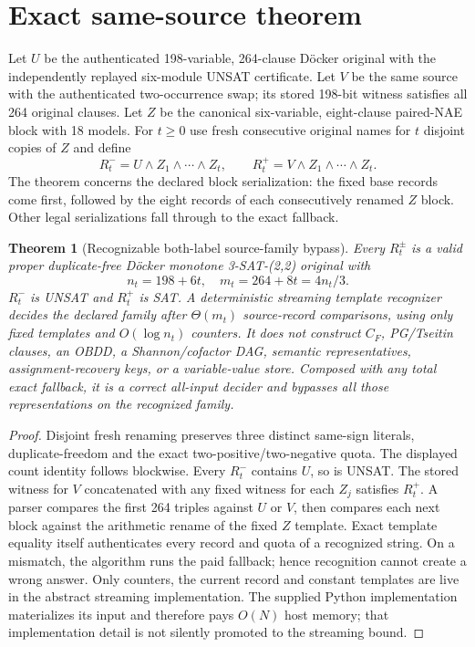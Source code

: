 \documentclass[11pt]{article}
\newtheorem{theorem}{Theorem}
\begin{document}
\section{Exact same-source theorem}
Let $U$ be the authenticated 198-variable, 264-clause D\"ocker original with
the independently replayed six-module UNSAT certificate.  Let $V$ be the
same source with the authenticated two-occurrence swap; its stored 198-bit
witness satisfies all 264 original clauses.  Let $Z$ be the canonical
six-variable, eight-clause paired-NAE block with 18 models.  For $t\ge0$ use
fresh consecutive original names for $t$ disjoint copies of $Z$ and define
\[
 R_t^- = U\wedge Z_1\wedge\cdots\wedge Z_t,
 \qquad R_t^+ = V\wedge Z_1\wedge\cdots\wedge Z_t .
\]
The theorem concerns the declared block serialization: the fixed base records
come first, followed by the eight records of each consecutively renamed $Z$
block.  Other legal serializations fall through to the exact fallback.

\begin{theorem}[Recognizable both-label source-family bypass]
Every $R_t^\pm$ is a valid proper duplicate-free D\"ocker monotone
3-SAT-(2,2) original with
\[
 n_t=198+6t,\quad m_t=264+8t=4n_t/3.
\]
$R_t^-$ is UNSAT and $R_t^+$ is SAT.  A deterministic streaming template
recognizer decides the declared family after $\Theta(m_t)$ source-record
comparisons, using only fixed templates and $O(\log n_t)$ counters.  It does
not construct $C_F$, PG/Tseitin clauses, an OBDD, a Shannon/cofactor DAG,
semantic representatives, assignment-recovery keys, or a variable-value
store.  Composed with any total exact fallback, it is a correct all-input
decider and bypasses all those representations on the recognized family.
\end{theorem}
\begin{proof}
Disjoint fresh renaming preserves three distinct same-sign literals,
duplicate-freedom and the exact two-positive/two-negative quota.  The displayed
count identity follows blockwise.  Every $R_t^-$ contains $U$, so is UNSAT.
The stored witness for $V$ concatenated with any fixed witness for each $Z_j$
satisfies $R_t^+$.  A parser compares the first 264 triples against $U$ or
$V$, then compares each next block against the arithmetic rename of the fixed
$Z$ template.  Exact template equality itself authenticates every record and
quota of a recognized string.  On a mismatch, the algorithm runs the paid
fallback; hence recognition cannot create a wrong answer.  Only counters,
the current record and constant templates are live in the abstract streaming
implementation.  The supplied Python implementation materializes its input
and therefore pays $O(N)$ host memory; that implementation detail is not
silently promoted to the streaming bound.
\end{proof}
\end{document}

